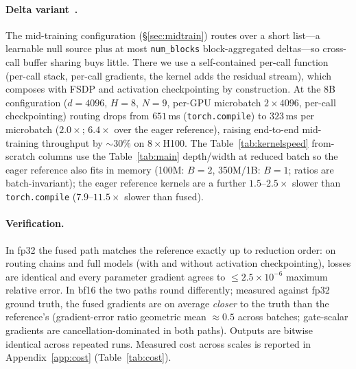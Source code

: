 \documentclass{article}
\begin{document}
\paragraph{Delta variant~\citep{luo2026delta}.} The mid-training configuration
(\S\ref{sec:midtrain}) routes over a short list---a learnable null source plus at
most \texttt{num\_blocks} block-aggregated deltas---so cross-call buffer sharing
buys little. There we use a self-contained per-call function (per-call stack,
per-call gradients, the kernel adds the residual stream), which composes with
FSDP and activation checkpointing by construction. At the 8B configuration
($d{=}4096$, $H{=}8$, $N{=}9$, per-GPU microbatch $2\times4096$, per-call
checkpointing) routing drops from $651$\,ms (\texttt{torch.compile}) to
$323$\,ms per microbatch ($2.0\times$; $6.4\times$ over the eager reference),
raising end-to-end mid-training throughput by ${\sim}30\%$ on $8\times$H100.
The Table~\ref{tab:kernelspeed} from-scratch columns use the
Table~\ref{tab:main} depth/width at reduced batch so the eager reference also
fits in memory (100M: $B{=}2$, 350M/1B: $B{=}1$; ratios are batch-invariant);
the eager reference kernels are a further $1.5$--$2.5\times$ slower than
\texttt{torch.compile} ($7.9$--$11.5\times$ slower than fused).

\paragraph{Verification.} In fp32 the fused path matches the reference
exactly up to reduction order: on routing chains and full models (with and
without activation checkpointing), losses are identical and every parameter
gradient agrees to $\le 2.5\times10^{-6}$ maximum relative error. In bf16 the two
paths round differently; measured against fp32 ground truth, the fused gradients
are on average \emph{closer} to the truth than the reference's (gradient-error
ratio geometric mean ${\approx}0.5$ across batches; gate-scalar gradients are
cancellation-dominated in both paths). Outputs are bitwise identical across
repeated runs. Measured cost across scales is reported in
Appendix~\ref{app:cost} (Table~\ref{tab:cost}).
\end{document}
